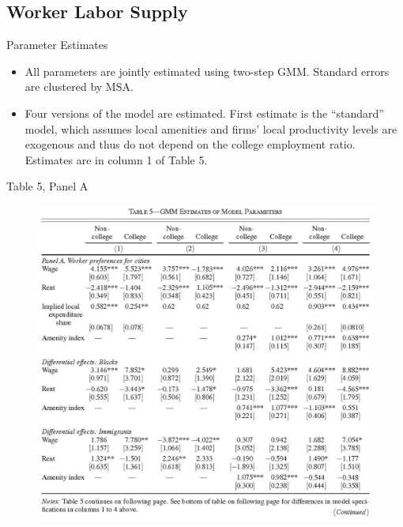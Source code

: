 \documentclass[aspectratio=169]{beamer}
\begin{document}
\subsection{Worker Labor Supply}


\begin{frame}{Parameter Estimates}

\begin{itemize}
    \item<1-> All parameters are jointly estimated using two-step GMM.  Standard errors are clustered by MSA.
    \item<2->  Four versions of the model are estimated.  First estimate is the “standard” model, which assumes local amenities and firms’ local productivity levels are exogenous and thus do not depend on the college employment ratio.  Estimates are in column 1 of Table 5.
\end{itemize}
    
\end{frame}


\begin{frame}{Table 5, Panel A}

\begin{figure}
    \centering
    \includegraphics[scale=0.55]{DiamondTable5_1.jpg}
    \label{fig:Table5a}
\end{figure}
    
\end{frame}
\end{document}
